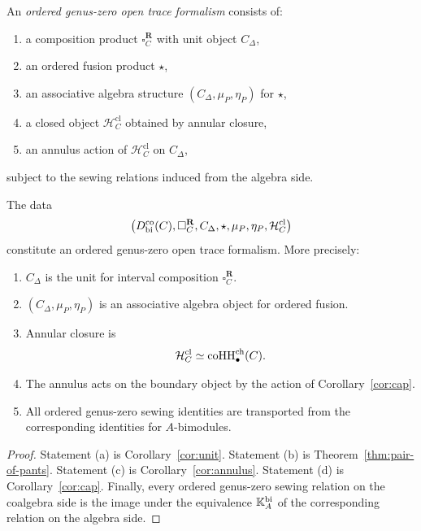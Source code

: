 \begin{definition}
An \emph{ordered genus-zero open trace formalism} consists of:
\begin{enumerate}[label=(\roman*)]
\item a composition product $\square_C^{\mathbf R}$ with unit object $C_\Delta$,
\item an ordered fusion product $\star$,
\item an associative algebra structure $(C_\Delta,\mu_P,\eta_P)$ for $\star$,
\item a closed object $\mathcal H_C^{\mathrm{cl}}$ obtained by annular closure,
\item an annulus action of $\mathcal H_C^{\mathrm{cl}}$ on $C_\Delta$,
\end{enumerate}
subject to the sewing relations induced from the algebra side.
\end{definition}

\begin{theorem}
\ClaimStatusProvedHere
\label{thm:ordered-open}
The data
\[
\bigl(D^{\mathrm{co}}_{\mathrm{bi}}(C),\square_C^{\mathbf R},C_\Delta,\star,\mu_P,\eta_P,\mathcal H_C^{\mathrm{cl}}\bigr)
\]
constitute an ordered genus-zero open trace formalism. More precisely:
\begin{enumerate}[label=(\alph*)]
\item $C_\Delta$ is the unit for interval composition $\square_C^{\mathbf R}$.
\item $(C_\Delta,\mu_P,\eta_P)$ is an associative algebra object for ordered fusion.
\item Annular closure is
\[
\mathcal H_C^{\mathrm{cl}}\simeq \operatorname{coHH}^{\mathrm{ch}}_\bullet(C).
\]
\item The annulus acts on the boundary object by the action of
Corollary~\ref{cor:cap}.
\item All ordered genus-zero sewing identities are transported from the corresponding identities for
$A$-bimodules.
\end{enumerate}
\end{theorem}

\begin{proof}
Statement (a) is Corollary~\ref{cor:unit}. Statement (b) is
Theorem~\ref{thm:pair-of-pants}. Statement (c) is
Corollary~\ref{cor:annulus}. Statement (d) is Corollary~\ref{cor:cap}.
Finally, every ordered genus-zero sewing relation on the coalgebra side is the image under the
equivalence $\mathbb{K}_A^{\mathrm{bi}}$ of the corresponding relation on the algebra side.
\end{proof}

